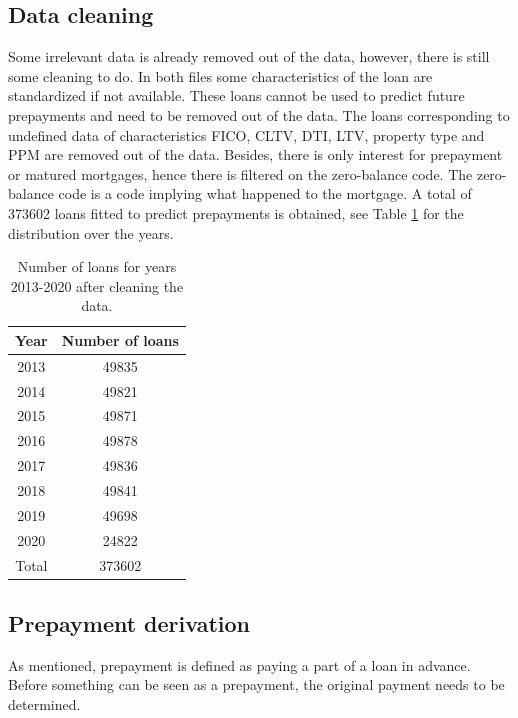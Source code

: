 \subsection{Data cleaning}
	Some irrelevant data is already removed out of the data, however, there is still some cleaning to do. In both files some characteristics of the loan are standardized if not available. These loans cannot be used to predict future prepayments and need to be removed out of the data. The loans corresponding to undefined data of characteristics FICO, CLTV, DTI, LTV, property type and PPM are removed out of the data. Besides, there is only interest for prepayment or matured mortgages, hence there is filtered on the zero-balance code. The zero-balance code is a code implying what happened to the mortgage. A total of 373602 loans fitted to predict prepayments is obtained, see Table \ref{model_cleaned data_table} for the distribution over the years. 
    \begin{table}[H]
        \centering
        \begin{tabular}{c|c}
            Year & Number of loans \\\hline
            2013 & 49835 \\
            2014 & 49821 \\
            2015 & 49871 \\
            2016 & 49878 \\
            2017 & 49836 \\
            2018 & 49841 \\
            2019 & 49698 \\
            2020 & 24822 \\\hline
            Total & 373602 
		\end{tabular}
		\caption{Number of loans for years 2013-2020 after cleaning the data.}
		\label{model_cleaned data_table}
    \end{table}
    
\subsection{Prepayment derivation}
    As mentioned, prepayment is defined as paying a part of a loan in advance. Before something can be seen as a prepayment, the original payment needs to be determined.
    
    
